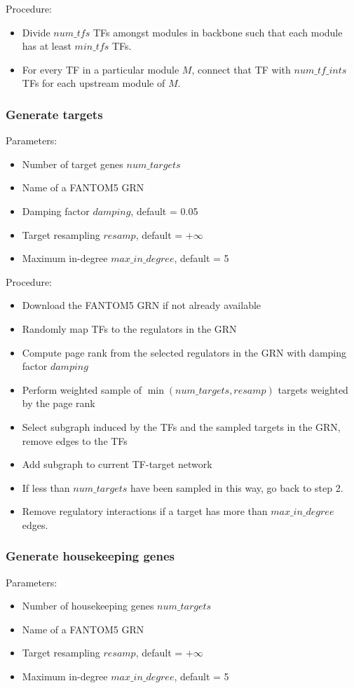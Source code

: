 Procedure: 
\begin{itemize}
	\item Divide $num\_tfs$ TFs amongst modules in backbone such that each module has at least $min\_tfs$ TFs.
	\item For every TF in a particular module $M$, connect that TF with $num\_tf\_ints$ TFs for each upstream module of $M$.
\end{itemize}

\subsubsection{Generate targets}
Parameters: 
\begin{itemize}
	\item Number of target genes $num\_targets$
	\item Name of a FANTOM5 GRN
	\item Damping factor $damping$, default = 0.05
	\item Target resampling $resamp$, default = $+\infty$
	\item Maximum in-degree $max\_in\_degree$, default = 5
\end{itemize}

Procedure:
\begin{itemize}
	\item Download the FANTOM5 GRN if not already available
	\item Randomly map TFs to the regulators in the GRN
	\item Compute page rank from the selected regulators in the GRN with damping factor $damping$
	\item Perform weighted sample of  $\min(num\_targets, resamp)$ targets weighted by the page rank
	\item Select subgraph induced by the TFs and the sampled targets in the GRN, remove edges to the TFs
	\item Add subgraph to current TF-target network
	\item If less than $num\_targets$ have been sampled in this way, go back to step 2.
	\item Remove regulatory interactions if a target has more than $max\_in\_degree$ edges.
\end{itemize}

\subsubsection{Generate housekeeping genes}
Parameters: 
\begin{itemize}
	\item Number of housekeeping genes $num\_targets$
	\item Name of a FANTOM5 GRN
	\item Target resampling $resamp$, default = $+\infty$
	\item Maximum in-degree $max\_in\_degree$, default = 5
\end{itemize}

